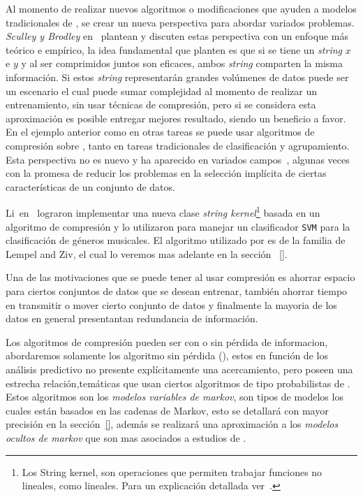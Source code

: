Al momento de realizar nuevos algoritmos o modificaciones que ayuden a modelos tradicionales de \machinelearning, se crear un nueva perspectiva para abordar variados problemas. \emph{Sculley y Brodley} en~\cite{Sculley2006} plantean y discuten estas perspectiva con un enfoque más teórico e empírico, la idea fundamental que planten es que si se tiene un \emph{string} $x$ e $y$ y al ser comprimidos juntos son eficaces, ambos \emph{string} comparten la misma información. Si estos \emph{string} representarán grandes volúmenes de datos puede ser un escenario el cual puede sumar complejidad al momento de realizar un entrenamiento, sin usar técnicas de compresión, pero si se considera esta aproximación es posible entregar mejores resultado, siendo un beneficio a favor. En el ejemplo anterior como en otras tareas se puede usar algoritmos de compresión sobre \machinelearning, tanto en tareas tradicionales de clasificación y agrupamiento.  Esta perspectiva no es nuevo y ha aparecido en variados campos~\cite{Sculley2006}, algunas veces con la promesa de reducir los problemas en la selección implícita de ciertas características de un conjunto de datos. 

Li~\etal en~\cite{Li2005} lograron implementar una nueva clase \emph{string kernel}\footnote{Los String kernel, son operaciones que permiten trabajar funciones no lineales, como lineales. Para un explicación detallada ver~\cite{Li2005}.} basada en un algoritmo de compresión y lo utilizaron para manejar un clasificador \texttt{SVM} para la clasificación de géneros musicales. El algoritmo utilizado por \cite{Sculley2006} es de la familia de {Lempel and Ziv}, el cual lo veremos mas adelante en la sección ~\ref{}.


Una de las motivaciones que se puede tener al usar compresión es ahorrar espacio para ciertos conjuntos de datos que se desean entrenar, también ahorrar tiempo en transmitir o mover cierto conjunto de datos y finalmente la mayoria de los datos en general presentantan redundancia de información.

Los algoritmos de compresión pueden ser con o sin pérdida de informacion, abordaremos solamente los algoritmo sin pérdida (\losslessdatacompression), estos en función de los análisis predictivo no presente explícitamente una acercamiento, pero poseen una estrecha relación,temáticas que usan ciertos algoritmos de tipo probabilistas de \machinelearning. Estos algoritmos son los \emph{modelos variables de markov}, son tipos de modelos los cuales están basados en las cadenas de Markov, esto se detallará con mayor precisión en la sección~\ref{}, además se realizará una aproximación a los \emph{modelos ocultos de markov} que son mas asociados a estudios de \machinelearning.





